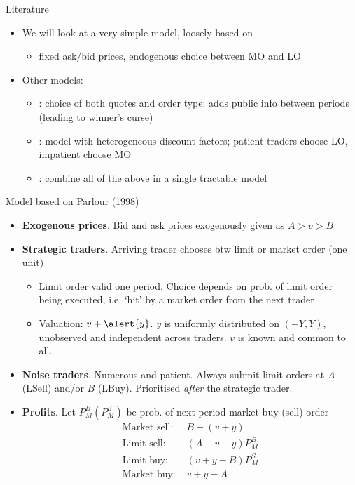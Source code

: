 \documentclass[english,10pt
,aspectratio=169
]{beamer}
\begin{document}
\begin{frame}{Literature}
	\begin{itemize}
		\item We will look at a very simple model, loosely based on \cite{parlour_price_1998}
		\begin{itemize}
			\item fixed ask/bid prices, endogenous choice between MO and LO
		\end{itemize}
		\item Other models:
		\begin{itemize}
			\item \cite{foucault_order_1999}: choice of both quotes and order type; adds public info between periods (leading to winner's curse)
			\item \citet*{foucault_limit_2005}: model with heterogeneous discount factors; patient traders choose LO, impatient choose MO
			\item \cite{bhattacharya_limit_2020}: combine all of the above in a single tractable model
		\end{itemize}
	\end{itemize}
\end{frame}


\begin{frame}{Model based on Parlour (1998)}
	\begin{itemize}
		\item \textbf{Exogenous prices}. Bid and ask prices \alert{exogenously} given as $A>v>B$
		\item \textbf{Strategic traders}. Arriving trader chooses btw limit or market order (one unit)
		\begin{itemize}
			\item Limit order valid one period. Choice depends on prob. of limit order being executed, i.e. `hit' by a market order from the next trader
			\item Valuation: $v+\alert{y}$. $y$ is uniformly distributed on $(-Y,Y)$, unobserved and independent across traders. $v$ is known and common to all.
		\end{itemize}
		\item \textbf{Noise traders}. Numerous and patient. Always submit limit orders at $A$ (LSell) and/or $B$ (LBuy). Prioritised \emph{after} the strategic trader.
		\pause
		\item \textbf{Profits}. Let $P^B_M (P^S_M)$ be prob. of next-period market buy (sell) order 
		\begin{align*}
		\text{Market sell: } & B-(v+y) \\
		\text{Limit sell: } & (A-v-y)P^B_M \\
		\text{Limit buy: } &(v+y-B)P^S_M \\
		\text{Market buy: } &v+y-A
		\end{align*}
	\end{itemize}
\end{frame}
\end{document}
